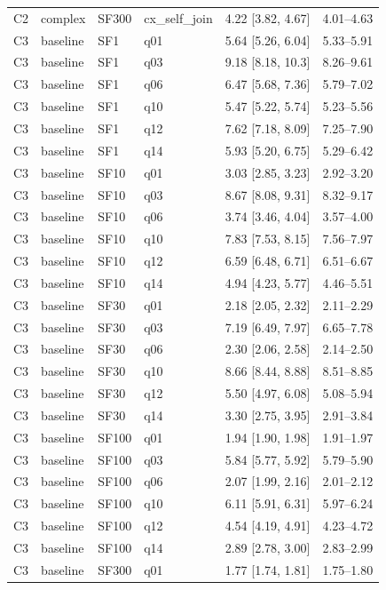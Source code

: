 \begin{longtable}{lllllr}
C2 & complex & SF300 & cx\_self\_join & 4.22 [3.82, 4.67] & 4.01--4.63 \\
C3 & baseline & SF1 & q01 & 5.64 [5.26, 6.04] & 5.33--5.91 \\
C3 & baseline & SF1 & q03 & 9.18 [8.18, 10.3] & 8.26--9.61 \\
C3 & baseline & SF1 & q06 & 6.47 [5.68, 7.36] & 5.79--7.02 \\
C3 & baseline & SF1 & q10 & 5.47 [5.22, 5.74] & 5.23--5.56 \\
C3 & baseline & SF1 & q12 & 7.62 [7.18, 8.09] & 7.25--7.90 \\
C3 & baseline & SF1 & q14 & 5.93 [5.20, 6.75] & 5.29--6.42 \\
C3 & baseline & SF10 & q01 & 3.03 [2.85, 3.23] & 2.92--3.20 \\
C3 & baseline & SF10 & q03 & 8.67 [8.08, 9.31] & 8.32--9.17 \\
C3 & baseline & SF10 & q06 & 3.74 [3.46, 4.04] & 3.57--4.00 \\
C3 & baseline & SF10 & q10 & 7.83 [7.53, 8.15] & 7.56--7.97 \\
C3 & baseline & SF10 & q12 & 6.59 [6.48, 6.71] & 6.51--6.67 \\
C3 & baseline & SF10 & q14 & 4.94 [4.23, 5.77] & 4.46--5.51 \\
C3 & baseline & SF30 & q01 & 2.18 [2.05, 2.32] & 2.11--2.29 \\
C3 & baseline & SF30 & q03 & 7.19 [6.49, 7.97] & 6.65--7.78 \\
C3 & baseline & SF30 & q06 & 2.30 [2.06, 2.58] & 2.14--2.50 \\
C3 & baseline & SF30 & q10 & 8.66 [8.44, 8.88] & 8.51--8.85 \\
C3 & baseline & SF30 & q12 & 5.50 [4.97, 6.08] & 5.08--5.94 \\
C3 & baseline & SF30 & q14 & 3.30 [2.75, 3.95] & 2.91--3.84 \\
C3 & baseline & SF100 & q01 & 1.94 [1.90, 1.98] & 1.91--1.97 \\
C3 & baseline & SF100 & q03 & 5.84 [5.77, 5.92] & 5.79--5.90 \\
C3 & baseline & SF100 & q06 & 2.07 [1.99, 2.16] & 2.01--2.12 \\
C3 & baseline & SF100 & q10 & 6.11 [5.91, 6.31] & 5.97--6.24 \\
C3 & baseline & SF100 & q12 & 4.54 [4.19, 4.91] & 4.23--4.72 \\
C3 & baseline & SF100 & q14 & 2.89 [2.78, 3.00] & 2.83--2.99 \\
C3 & baseline & SF300 & q01 & 1.77 [1.74, 1.81] & 1.75--1.80 \\

\end{longtable}
